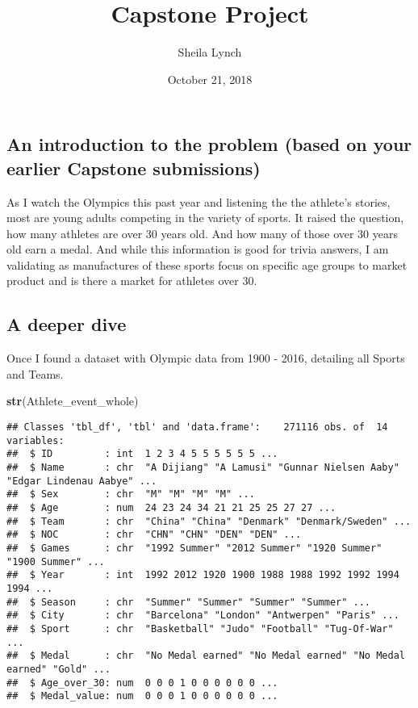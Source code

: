 \documentclass[]{article}
\title{Capstone Project}
\author{Sheila Lynch}
\date{October 21, 2018}
\newenvironment{Shaded}{\begin{snugshade}}{\end{snugshade}}
\newcommand{\KeywordTok}[1]{\textcolor[rgb]{0.13,0.29,0.53}{\textbf{#1}}}
\newcommand{\NormalTok}[1]{#1}
\begin{document}
\maketitle

\subsection{An introduction to the problem (based on your earlier
Capstone
submissions)}\label{an-introduction-to-the-problem-based-on-your-earlier-capstone-submissions}

As I watch the Olympics this past year and listening the the athlete's
stories, most are young adults competing in the variety of sports. It
raised the question, how many athletes are over 30 years old. And how
many of those over 30 years old earn a medal. And while this information
is good for trivia answers, I am validating as manufactures of these
sports focus on specific age groups to market product and is there a
market for athletes over 30.

\subsection{A deeper dive}\label{a-deeper-dive}

Once I found a dataset with Olympic data from 1900 - 2016, detailing all
Sports and Teams.

\begin{Shaded}
\begin{Highlighting}[]
\KeywordTok{str}\NormalTok{(Athlete_event_whole)}
\end{Highlighting}
\end{Shaded}

\begin{verbatim}
## Classes 'tbl_df', 'tbl' and 'data.frame':    271116 obs. of  14 variables:
##  $ ID         : int  1 2 3 4 5 5 5 5 5 5 ...
##  $ Name       : chr  "A Dijiang" "A Lamusi" "Gunnar Nielsen Aaby" "Edgar Lindenau Aabye" ...
##  $ Sex        : chr  "M" "M" "M" "M" ...
##  $ Age        : num  24 23 24 34 21 21 25 25 27 27 ...
##  $ Team       : chr  "China" "China" "Denmark" "Denmark/Sweden" ...
##  $ NOC        : chr  "CHN" "CHN" "DEN" "DEN" ...
##  $ Games      : chr  "1992 Summer" "2012 Summer" "1920 Summer" "1900 Summer" ...
##  $ Year       : int  1992 2012 1920 1900 1988 1988 1992 1992 1994 1994 ...
##  $ Season     : chr  "Summer" "Summer" "Summer" "Summer" ...
##  $ City       : chr  "Barcelona" "London" "Antwerpen" "Paris" ...
##  $ Sport      : chr  "Basketball" "Judo" "Football" "Tug-Of-War" ...
##  $ Medal      : chr  "No Medal earned" "No Medal earned" "No Medal earned" "Gold" ...
##  $ Age_over_30: num  0 0 0 1 0 0 0 0 0 0 ...
##  $ Medal_value: num  0 0 0 1 0 0 0 0 0 0 ...
\end{verbatim}
\end{document}
